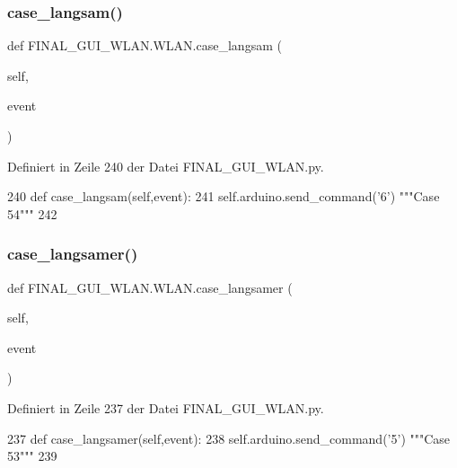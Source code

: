 \subsubsection{\texorpdfstring{case\+\_\+langsam()}{case\_langsam()}}
{\footnotesize\ttfamily def F\+I\+N\+A\+L\+\_\+\+G\+U\+I\+\_\+\+W\+L\+A\+N.\+W\+L\+A\+N.\+case\+\_\+langsam (\begin{DoxyParamCaption}\item[{}]{self,  }\item[{}]{event }\end{DoxyParamCaption})}



Definiert in Zeile 240 der Datei F\+I\+N\+A\+L\+\_\+\+G\+U\+I\+\_\+\+W\+L\+A\+N.\+py.


\begin{DoxyCode}
240     \textcolor{keyword}{def }case\_langsam(self,event):
241         self.arduino.send\_command(\textcolor{stringliteral}{'6'})  \textcolor{stringliteral}{"""Case 54"""}
242         
\end{DoxyCode}
\mbox{\label{class_f_i_n_a_l___g_u_i___w_l_a_n_1_1_w_l_a_n_a307f1abe3cdb76fb877c4267dceb0c82}} 
\subsubsection{\texorpdfstring{case\+\_\+langsamer()}{case\_langsamer()}}
{\footnotesize\ttfamily def F\+I\+N\+A\+L\+\_\+\+G\+U\+I\+\_\+\+W\+L\+A\+N.\+W\+L\+A\+N.\+case\+\_\+langsamer (\begin{DoxyParamCaption}\item[{}]{self,  }\item[{}]{event }\end{DoxyParamCaption})}



Definiert in Zeile 237 der Datei F\+I\+N\+A\+L\+\_\+\+G\+U\+I\+\_\+\+W\+L\+A\+N.\+py.


\begin{DoxyCode}
237     \textcolor{keyword}{def }case\_langsamer(self,event):
238         self.arduino.send\_command(\textcolor{stringliteral}{'5'})  \textcolor{stringliteral}{"""Case 53"""}
239     
\end{DoxyCode}
\mbox{\label{class_f_i_n_a_l___g_u_i___w_l_a_n_1_1_w_l_a_n_a5b05b7870d7878a5acc142d81c908b2b}} 
